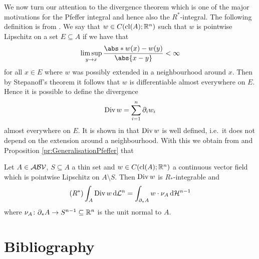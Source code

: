 \noindent We now turn our attention to the divergence theorem which is one of the major motivations for the Pfeffer integral and hence also the $R^*$-integral.
The following definition is from \cite{Pfe1991}.
We say that $w\in C(\operatorname{cl}(A);\mathbb{R}^n)$ such that $w$ is pointwise Lipschitz on a set $E\subseteq A$ if we have that
\begin{align*}
	\limsup_{y\to x}\frac{\abs*{w(x)-w(y)}}{\abs{x-y}}<\infty
\end{align*}
for all $x\in E$ where $w$ was possibly extended in a neighbourhood around $x$. Then by Stepanoff's theorem it follows that $w$ is differentiable almost everywhere on $E$. Hence it is possible to define the divergence
\begin{align*}
	\operatorname{Div} w=\sum_{i=1}^n\partial_iw_i
\end{align*}
almost everywhere on $E$. It is shown in \cite[Lemma 5.16]{Pfe1991} that $\operatorname{Div} w$ is well defined, i.e.\ it does not depend on the extension around a neighbourhood. With this we obtain from \cite[Theorem 5.19]{Pfe1991} and Proposition \ref{pr:GeneralisationPfeffer} that

\begin{theorem}
Let $A\in\mathcal{ABV}$, $S\subseteq A$ a thin set and $w\in C(\operatorname{cl}(A);\mathbb{R}^n)$ a continuous vector field which is pointwise Lipschitz on $A\setminus S$. Then $\operatorname{Div} w$ is $R_*$-integrable and
\begin{align*}
	(R^*)\int_A\operatorname{Div} w\,\mathrm{d} \mathcal{L}^n=\int_{\partial_* A}w\cdot \nu_A\,\mathrm{d} \mathcal{H}^{n-1}
\end{align*}
where $\nu_A\colon \partial_* A\to S^{n-1}\subseteq\mathbb{R}^n$ is the unit normal to $A$.
\end{theorem}

\section*{Bibliography}
\nocite{*}
\printbibliography[heading=none]



